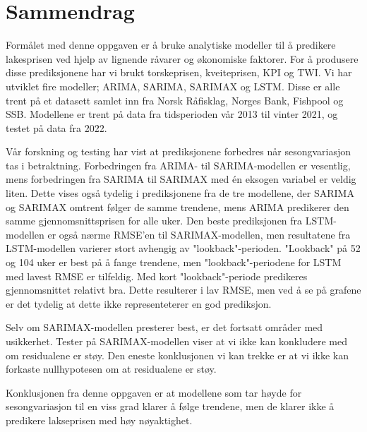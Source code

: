 \section*{Sammendrag}
Formålet med denne oppgaven er å bruke analytiske modeller til å predikere lakesprisen ved hjelp av lignende råvarer og økonomiske faktorer. For å produsere disse prediksjonene har vi brukt torskeprisen, kveiteprisen, KPI og TWI. Vi har utviklet fire modeller; ARIMA, SARIMA, SARIMAX og LSTM. Disse er alle trent på et datasett samlet inn fra Norsk Råfisklag, Norges Bank, Fishpool og SSB. Modellene er trent på data fra tidsperioden vår 2013 til vinter 2021, og testet på data fra 2022.

Vår forskning og testing har vist at prediksjonene forbedres når sesongvariasjon tas i betraktning. Forbedringen fra ARIMA- til SARIMA-modellen er vesentlig, mens forbedringen fra SARIMA til SARIMAX med én eksogen variabel er veldig liten. Dette vises også tydelig i prediksjonene fra de tre modellene, der SARIMA og SARIMAX omtrent følger de samme trendene, mens ARIMA predikerer den samme gjennomsnittsprisen for alle uker. Den beste prediksjonen fra LSTM-modellen er også nærme RMSE'en til SARIMAX-modellen, men resultatene fra LSTM-modellen varierer stort avhengig av "lookback"-perioden. "Lookback" på 52 og 104 uker er best på å fange trendene, men "lookback"-periodene for LSTM med lavest RMSE er tilfeldig. Med kort "lookback"-periode predikeres gjennomsnittet relativt bra. Dette resulterer i lav RMSE, men ved å se på grafene er det tydelig at dette ikke representeterer en god prediksjon. 

Selv om SARIMAX-modellen presterer best, er det fortsatt områder med usikkerhet. Tester på SARIMAX-modellen viser at vi ikke kan konkludere med om residualene er støy. Den eneste konklusjonen vi kan trekke er at vi ikke kan forkaste nullhypotesen om at residualene er støy.

Konklusjonen fra denne oppgaven er at modellene som tar høyde for sesongvariasjon til en viss grad klarer å følge trendene, men de klarer ikke å predikere lakseprisen med høy nøyaktighet. 


